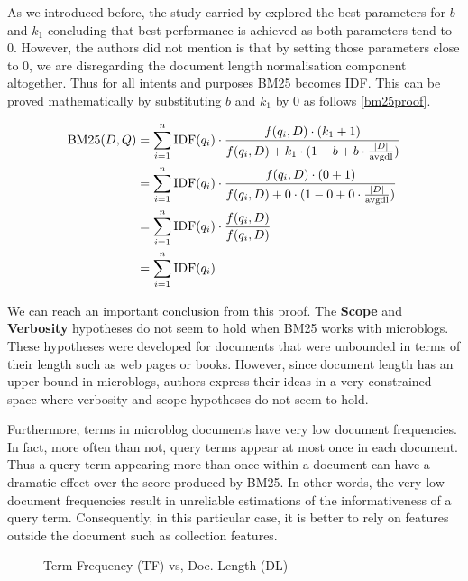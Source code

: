 As we introduced before, the study carried by \cite{ferguson2012investigation} explored the best parameters for \(b\) and \(k_1\) concluding that best performance is achieved as both parameters tend to 0. However, the authors did not mention is that by setting those parameters close to 0, we are disregarding the document length normalisation component altogether. Thus for all intents and purposes BM25 becomes IDF. This can be proved mathematically by substituting \(b\) and \(k_1\) by 0 as follows \ref{bm25proof}.

\begin{small}
\begin{align}
\label{bm25proof}
    \notag \text{BM25}(D,Q) &= \sum_{i=1}^{n} \text{IDF}(q_i) \cdot \frac{f(q_i, D) \cdot (k_1 + 1)}{f(q_i, D) + k_1 \cdot (1 - b + b \cdot \frac{|D|}{\text{avgdl}})} \\
  \notag&= \sum_{i=1}^{n} \text{IDF}(q_i) \cdot \frac{f(q_i, D) \cdot (0 + 1)}{f(q_i, D) + 0 \cdot (1 - 0 + 0 \cdot \frac{|D|}{\text{avgdl}})} \\
  \notag&= \sum_{i=1}^{n} \text{IDF}(q_i) \cdot \frac{f(q_i, D)}{f(q_i, D) } \\
  &= \sum_{i=1}^{n} \text{IDF}(q_i)              
\end{align}
\end{small}

We can reach an important conclusion from this proof. The \textbf{Scope} and \textbf{Verbosity} hypotheses do not seem to hold when BM25 works with microblogs. These hypotheses were developed for documents that were unbounded in terms of their length such as web pages or books. However, since document length has an upper bound in microblogs, authors express their ideas in a very constrained space where verbosity and scope hypotheses do not seem to hold.

Furthermore, terms in microblog documents have very low document frequencies. In fact, more often than not, query terms appear at most once in each document. Thus a query term appearing more than once within a document can have a dramatic effect over the score produced by BM25. In other words, the very low document frequencies result in unreliable estimations of the informativeness of a query term. Consequently, in this particular case, it is better to rely on features outside the document such as collection features.

\begin{figure}[]
  \centering
   
     \caption{Term Frequency (TF) vs, Doc. Length (DL)}
  \label{bm25scoretfdl}
\end{figure}

